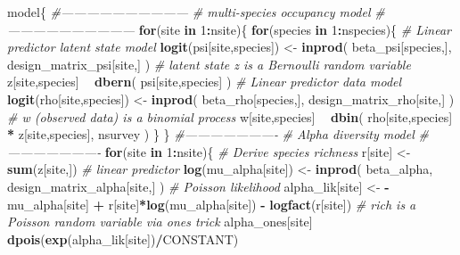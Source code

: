 \documentclass[
]{article}
\newenvironment{Shaded}{\begin{snugshade}}{\end{snugshade}}
\newcommand{\CommentTok}[1]{\textcolor[rgb]{0.56,0.35,0.01}{\textit{#1}}}
\newcommand{\ControlFlowTok}[1]{\textcolor[rgb]{0.13,0.29,0.53}{\textbf{#1}}}
\newcommand{\DecValTok}[1]{\textcolor[rgb]{0.00,0.00,0.81}{#1}}
\newcommand{\KeywordTok}[1]{\textcolor[rgb]{0.13,0.29,0.53}{\textbf{#1}}}
\newcommand{\NormalTok}[1]{#1}
\newcommand{\OperatorTok}[1]{\textcolor[rgb]{0.81,0.36,0.00}{\textbf{#1}}}
\newcommand{\StringTok}[1]{\textcolor[rgb]{0.31,0.60,0.02}{#1}}
\begin{document}
\begin{Shaded}
\begin{Highlighting}[]
\NormalTok{model\{}
  \CommentTok{#------------------------------}
  \CommentTok{# multi-species occupancy model}
  \CommentTok{#------------------------------}
  \ControlFlowTok{for}\NormalTok{(site }\ControlFlowTok{in} \DecValTok{1}\OperatorTok{:}\NormalTok{nsite)\{}
    \ControlFlowTok{for}\NormalTok{(species }\ControlFlowTok{in} \DecValTok{1}\OperatorTok{:}\NormalTok{nspecies)\{}
      \CommentTok{# Linear predictor latent state model}
      \KeywordTok{logit}\NormalTok{(psi[site,species]) <-}\StringTok{ }\KeywordTok{inprod}\NormalTok{(}
\NormalTok{        beta_psi[species,],}
\NormalTok{        design_matrix_psi[site,]}
\NormalTok{      )}
      \CommentTok{# latent state z is a Bernoulli random variable}
\NormalTok{      z[site,species] }\OperatorTok{~}\StringTok{ }\KeywordTok{dbern}\NormalTok{(}
\NormalTok{        psi[site,species]}
\NormalTok{      )}
      \CommentTok{# Linear predictor data model}
      \KeywordTok{logit}\NormalTok{(rho[site,species]) <-}\StringTok{ }\KeywordTok{inprod}\NormalTok{(}
\NormalTok{        beta_rho[species,],}
\NormalTok{        design_matrix_rho[site,]}
\NormalTok{      )}
      \CommentTok{# w (observed data) is a binomial process}
\NormalTok{      w[site,species] }\OperatorTok{~}\StringTok{ }\KeywordTok{dbin}\NormalTok{(}
\NormalTok{        rho[site,species] }\OperatorTok{*}\StringTok{ }\NormalTok{z[site,species],}
\NormalTok{        nsurvey}
\NormalTok{      )}
\NormalTok{    \}}
\NormalTok{  \}}
  \CommentTok{#----------------------}
  \CommentTok{# Alpha diversity model}
  \CommentTok{#----------------------}
  \ControlFlowTok{for}\NormalTok{(site }\ControlFlowTok{in} \DecValTok{1}\OperatorTok{:}\NormalTok{nsite)\{}
    \CommentTok{# Derive species richness}
\NormalTok{    r[site] <-}\StringTok{ }\KeywordTok{sum}\NormalTok{(z[site,])}
    \CommentTok{# linear predictor}
    \KeywordTok{log}\NormalTok{(mu_alpha[site]) <-}\StringTok{ }\KeywordTok{inprod}\NormalTok{(}
\NormalTok{      beta_alpha,}
\NormalTok{      design_matrix_alpha[site,]}
\NormalTok{      )}
    \CommentTok{# Poisson likelihood}
\NormalTok{    alpha_lik[site] <-}\StringTok{ }\OperatorTok{-}\NormalTok{mu_alpha[site] }\OperatorTok{+}\StringTok{ }
\StringTok{      }\NormalTok{r[site]}\OperatorTok{*}\KeywordTok{log}\NormalTok{(mu_alpha[site]) }\OperatorTok{-}\StringTok{ }\KeywordTok{logfact}\NormalTok{(r[site])}
    \CommentTok{# rich is a Poisson random variable via ones trick}
\NormalTok{    alpha_ones[site] }\OperatorTok{~}\StringTok{ }\KeywordTok{dpois}\NormalTok{(}\KeywordTok{exp}\NormalTok{(alpha_lik[site])}\OperatorTok{/}\NormalTok{CONSTANT)}

\end{Highlighting}
\end{Shaded}
\end{document}
